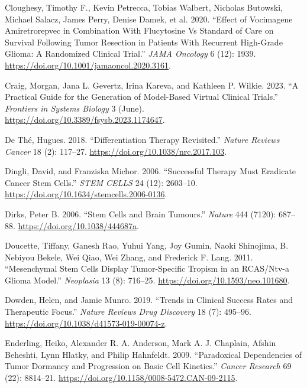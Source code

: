 \documentclass[
  letterpaper,
]{scrreprt}
\newlength{\cslhangindent}
\newenvironment{CSLReferences}[2] %
 {\begin{list}{}{%
  \setlength{\itemindent}{0pt}
  \setlength{\leftmargin}{0pt}
  \setlength{\parsep}{0pt}
  \ifodd #1
   \setlength{\leftmargin}{\cslhangindent}
   \setlength{\itemindent}{-1\cslhangindent}
  \fi
  \setlength{\itemsep}{#2\baselineskip}}}
 {\end{list}}
\theoremstyle{definition}
\theoremstyle{remark}
\begin{document}
\begin{CSLReferences}{1}{0}
Cloughesy, Timothy F., Kevin Petrecca, Tobias Walbert, Nicholas
Butowski, Michael Salacz, James Perry, Denise Damek, et al. 2020.
{``Effect of Vocimagene Amiretrorepvec in Combination With Flucytosine
Vs Standard of Care on Survival Following Tumor Resection in Patients
With Recurrent High-Grade Glioma: A Randomized Clinical Trial.''}
\emph{JAMA Oncology} 6 (12): 1939.
\url{https://doi.org/10.1001/jamaoncol.2020.3161}.

Craig, Morgan, Jana L. Gevertz, Irina Kareva, and Kathleen P. Wilkie.
2023. {``A Practical Guide for the Generation of Model-Based Virtual
Clinical Trials.''} \emph{Frontiers in Systems Biology} 3 (June).
\url{https://doi.org/10.3389/fsysb.2023.1174647}.

De Thé, Hugues. 2018. {``Differentiation Therapy Revisited.''}
\emph{Nature Reviews Cancer} 18 (2): 117--27.
\url{https://doi.org/10.1038/nrc.2017.103}.

Dingli, David, and Franziska Michor. 2006. {``Successful Therapy Must
Eradicate Cancer Stem Cells.''} \emph{STEM CELLS} 24 (12): 2603--10.
\url{https://doi.org/10.1634/stemcells.2006-0136}.

Dirks, Peter B. 2006. {``Stem Cells and Brain Tumours.''} \emph{Nature}
444 (7120): 687--88. \url{https://doi.org/10.1038/444687a}.

Doucette, Tiffany, Ganesh Rao, Yuhui Yang, Joy Gumin, Naoki Shinojima,
B. Nebiyou Bekele, Wei Qiao, Wei Zhang, and Frederick F. Lang. 2011.
{``Mesenchymal Stem Cells Display Tumor-Specific Tropism in an
RCAS/Ntv-a Glioma Model.''} \emph{Neoplasia} 13 (8): 716--25.
\url{https://doi.org/10.1593/neo.101680}.

Dowden, Helen, and Jamie Munro. 2019. {``Trends in Clinical Success
Rates and Therapeutic Focus.''} \emph{Nature Reviews Drug Discovery} 18
(7): 495--96. \url{https://doi.org/10.1038/d41573-019-00074-z}.

Enderling, Heiko, Alexander R. A. Anderson, Mark A. J. Chaplain, Afshin
Beheshti, Lynn Hlatky, and Philip Hahnfeldt. 2009. {``Paradoxical
Dependencies of Tumor Dormancy and Progression on Basic Cell
Kinetics.''} \emph{Cancer Research} 69 (22): 8814--21.
\url{https://doi.org/10.1158/0008-5472.CAN-09-2115}.


\end{CSLReferences}
\end{document}
